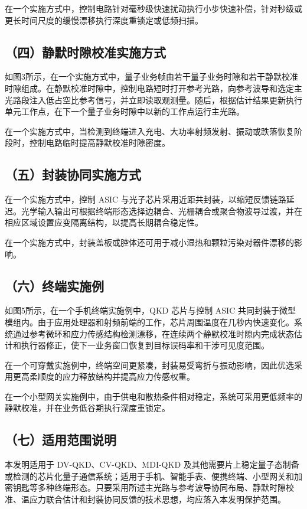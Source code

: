 \documentclass[12pt,a4paper]{article}
\begin{document}
在一个实施方式中，控制电路针对毫秒级快速扰动执行小步快速补偿，针对秒级或更长时间尺度的缓慢漂移执行深度重锁定或低频扫描。

\subsection*{（四）静默时隙校准实施方式}

如图3所示，在一个实施方式中，量子业务帧由若干量子业务时隙和若干静默校准时隙组成。在静默校准时隙中，控制电路短时打开参考光路，向参考波导和选定主光路段注入低占空比参考信号，并立即读取观测量。随后，根据估计结果更新执行单元工作点，在下一个量子业务时隙中以新的工作点运行主光路。

在一个实施方式中，当检测到终端进入充电、大功率射频发射、振动或跌落恢复阶段时，控制电路临时提高静默校准时隙密度。

\subsection*{（五）封装协同实施方式}

在一个实施方式中，控制 ASIC 与光子芯片采用近距共封装，以缩短反馈链路延迟。光学输入输出可根据终端形态选择边耦合、光栅耦合或聚合物波导过渡，并在相应区域设置应变隔离结构，以提高长期耦合稳定性。

在一个实施方式中，封装盖板或腔体还可用于减小湿热和颗粒污染对器件漂移的影响。

\subsection*{（六）终端实施例}

如图5所示，在一个手机终端实施例中，QKD 芯片与控制 ASIC 共同封装于微型模组内。由于应用处理器和射频前端的工作，芯片周围温度在几秒内快速变化。系统通过参考微环和应力传感结构检测漂移，在连续两个静默校准时隙内完成状态估计和执行器修正，使下一业务窗口恢复到目标误码率和干涉可见度范围。

在一个可穿戴实施例中，终端空间更紧凑，封装易受弯折与振动影响，因此优选采用更高柔顺度的应力释放结构并提高应力传感权重。

在一个小型网关实施例中，由于供电和散热条件相对稳定，系统可采用更低频率的静默校准，并在业务低谷期执行深度重锁定。

\subsection*{（七）适用范围说明}

本发明适用于 DV-QKD、CV-QKD、MDI-QKD 及其他需要片上稳定量子态制备或检测的芯片化量子通信系统；适用于手机、智能手表、便携终端、小型网关和加密钥匙等多种终端形态。只要采用所述主光路与参考波导协同布局、静默时隙校准、温应力联合估计和封装协同反馈的技术思想，均应落入本发明保护范围。
\end{document}
